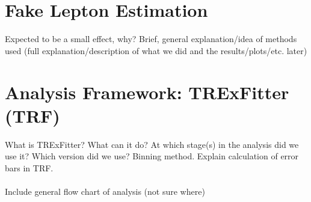 \section{Fake Lepton Estimation} 
Expected to be a small effect, why? Brief, general explanation/idea of methods used (full explanation/description of what we did and the results/plots/etc. later) 
\section{Analysis Framework: TRExFitter (TRF)}
What is TRExFitter? What can it do? At which stage(s) in the analysis did we use it? Which version did we use? Binning method. Explain calculation of error bars in TRF. \\\\ 
Include general flow chart of analysis (not sure where)








